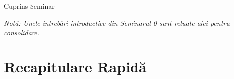 \documentclass[9pt, aspectratio=169, t]{beamer}
\subtitle{Seminar 1: Introducere în Seriile de Timp}
\begin{document}
{
\begin{frame}
    \titlepage
\end{frame}
}


\begin{frame}{Cuprins Seminar}
    \tableofcontents

    \vspace{0.3cm}
    {\footnotesize \textit{Notă: Unele întrebări introductive din Seminarul 0 sunt reluate aici pentru consolidare.}}
\end{frame}

\section{Recapitulare Rapidă}
\end{document}
